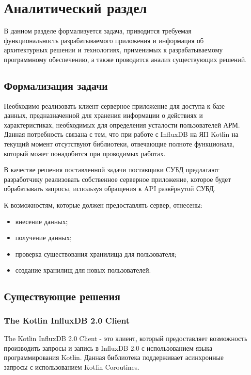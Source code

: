\section{Аналитический раздел}
В данном разделе формализуется задача, приводится требуемая функциональность разрабатываемого приложения и информация об архитектурных решении и технологиях, применимых к разрабатываемому программному обеспечению, а также проводится анализ существующих решений.

\subsection{Формализация задачи}
Необходимо реализовать клиент-серверное приложение для доступа к базе данных, предназначенной для хранения информации о действиях и характеристиках, необходимых для определения усталости пользователей АРМ. Данная потребность связана с тем, что при работе с InfluxDB на ЯП Kotlin на текущий момент отсутствуют библиотеки, отвечающие полноте функционала, который может понадобится при проводимых работах.

В качестве решения поставленной задачи поставщики СУБД предлагают разработчику реализовать собственное серверное приложение, которое будет обрабатывать запросы, используя обращения к API развёрнутой СУБД.

К возможностям, которые должен предоставлять сервер, отнесены:
\begin{itemize}[leftmargin=1.6\parindent]
\item внесение данных;
\item получение данных;
\item проверка существования хранилища для пользователя;
\item создание хранилищ для новых пользователей.
\end{itemize}

\subsection{Существующие решения}
\subsubsection{The Kotlin InfluxDB 2.0 Client}
The Kotlin InfluxDB 2.0 Client \cite{influxClient} - это клиент, который предоставляет возможность производить запросы и запись в InfluxDB 2.0 с использованием языка программирования Kotlin. Данная библиотека поддерживает асинхронные запросы с использованием Kotlin Coroutines.

